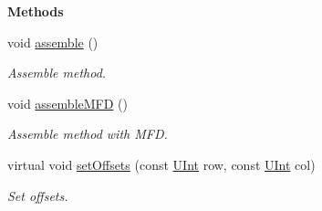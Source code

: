 \begin{Indent}{\bf Methods}\par
\begin{DoxyCompactItemize}
\item 
void \hyperlink{classFVCode3D_1_1StiffMatrix_af63e81815a2ba8bd62a2156a80adce55}{assemble} ()
\begin{DoxyCompactList}\small\item\em Assemble method. \end{DoxyCompactList}\item 
void \hyperlink{classFVCode3D_1_1StiffMatrix_ac3eb491563c1742f4adba021e397719b}{assemble\+M\+FD} ()
\begin{DoxyCompactList}\small\item\em Assemble method with M\+FD. \end{DoxyCompactList}\item 
virtual void \hyperlink{classFVCode3D_1_1StiffMatrix_a21f75de574e807c965eedb52f626527e}{set\+Offsets} (const \hyperlink{namespaceFVCode3D_a4bf7e328c75d0fd504050d040ebe9eda}{U\+Int} row, const \hyperlink{namespaceFVCode3D_a4bf7e328c75d0fd504050d040ebe9eda}{U\+Int} col)
\begin{DoxyCompactList}\small\item\em Set offsets. \end{DoxyCompactList}\end{DoxyCompactItemize}
\end{Indent}
